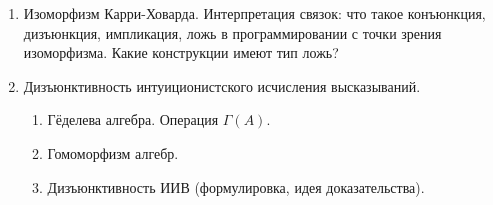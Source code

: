 \documentclass[11pt,a4paper,oneside]{scrartcl}
\begin{document}
\begin{enumerate}
\begin{enumerate}
\item Интуиционизм (программа Брауэра). BHK-интерпретация (в том числе расшифровка названия).
\item Связь с формальными логиками. Закон исключённого третьего, принцип взрыва, классическая, интуиционистская, позитивная логики.
\item Решётки. Топология как решётка.
\item Дистрибутивная решётка. 
\item Подрешётка. Диамант и пентагон, дистрибутивная решётка как решётка без диамантов/пентагонов.
\item Псевдодополнение. Булевы и псевдобулевы алгебры.
\item Алгебра Линденбаума. 
\item Полнота интуиционистского исчисления высказываний в псевдобулевых алгебрах (формулировка, идея доказательства).
\item Модели Крипке. Вынужденность.
\item Сведение моделей Крипке к псевдобулевым алгебрам. 
\item Нетабличность ИИВ (формулировка теоремы).
\item Разрешимость ИИВ (формулировка теорем, пояснение конструкции-аналога ДНФ на решётках).
\end{enumerate}
\item Изоморфизм Карри-Ховарда. Интерпретация связок: что такое конъюнкция,
дизъюнкция, импликация, ложь в программировании с точки зрения изоморфизма.
Какие конструкции имеют тип ложь?
\item Дизъюнктивность интуиционистского исчисления высказываний.
\begin{enumerate}
\item Гёделева алгебра. Операция $\Gamma(A)$.
\item Гомоморфизм алгебр.
\item Дизъюнктивность ИИВ (формулировка, идея доказательства).
\end{enumerate}

\end{enumerate}
\end{document}
